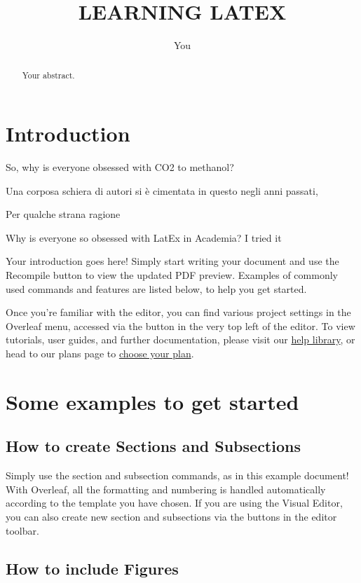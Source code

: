 \documentclass{article}
\title{
LEARNING LATEX
}
\author{You}
\begin{document}
\maketitle

\begin{abstract}
Your abstract.
\end{abstract}

\section{Introduction}

So, why is everyone obsessed with CO2 to methanol?

Una corposa schiera di autori si è cimentata in questo negli anni passati,


Per qualche strana ragione

Why is everyone so obsessed with LatEx in Academia?
I tried it 

Your introduction goes here! Simply start writing your document and use the Recompile button to view the updated PDF preview. Examples of commonly used commands and features are listed below, to help you get started.

Once you're familiar with the editor, you can find various project settings in the Overleaf menu, accessed via the button in the very top left of the editor. To view tutorials, user guides, and further documentation, please visit our \href{https://www.overleaf.com/learn}{help library}, or head to our plans page to \href{https://www.overleaf.com/user/subscription/plans}{choose your plan}.

\section{Some examples to get started}

\subsection{How to create Sections and Subsections}

Simply use the section and subsection commands, as in this example document! With Overleaf, all the formatting and numbering is handled automatically according to the template you have chosen. If you are using the Visual Editor, you can also create new section and subsections via the buttons in the editor toolbar.

\subsection{How to include Figures}
\end{document}

